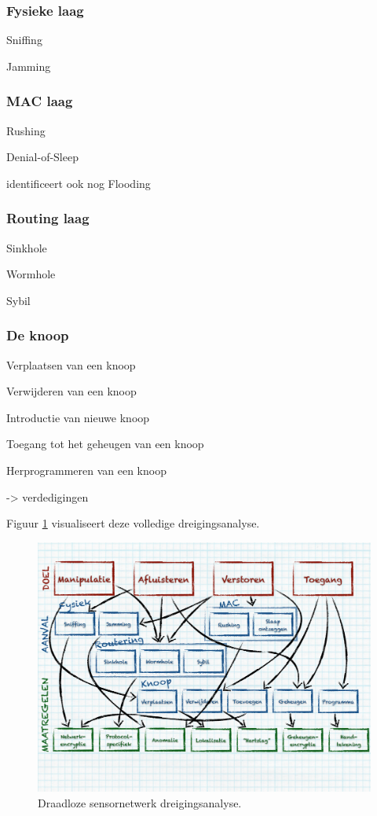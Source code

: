 \subsubsection*{Fysieke laag}

Sniffing

Jamming

\subsubsection*{MAC laag}

Rushing

Denial-of-Sleep

\TODO \cite{dargie2010fundamentals} identificeert ook nog Flooding 

\subsubsection*{Routing laag}

Sinkhole

Wormhole

Sybil

\subsubsection*{De knoop}

Verplaatsen van een knoop

Verwijderen van een knoop

Introductie van nieuwe knoop

Toegang tot het geheugen van een knoop

Herprogrammeren van een knoop

\TODO -> verdedigingen

Figuur \ref{fig:wsn-threat-analysis} visualiseert deze volledige
dreigingsanalyse.

\begin{figure}
  \centering
  \includegraphics[width=0.9\linewidth]{resources/wsn-threat-analysis.pdf}
  \caption{Draadloze sensornetwerk dreigingsanalyse.}
  \label{fig:wsn-threat-analysis}
\end{figure}

